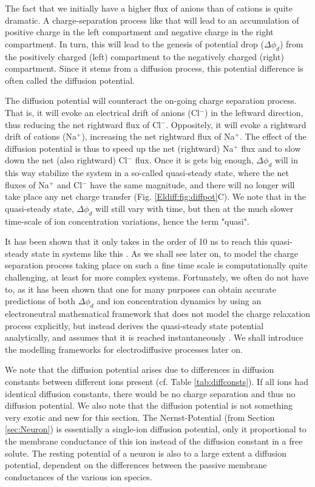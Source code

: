 The fact that we initially have a higher flux of anions than of cations is quite dramatic. A charge-separation process like that will lead to an accumulation of positive charge in the left compartment and negative charge in the right compartment. In turn, this will lead to the genesis of potential drop ($\Delta \phi_d$) from the positively charged (left) compartment to the negatively charged (right) compartment. Since it stems from a diffusion process, this potential difference is often called the diffusion potential. 

The diffusion potential will counteract the on-going charge separation process. That is, it will evoke an electrical drift of anions (Cl$^-$) in the leftward direction, thus reducing the net rightward flux of Cl$^-$. Oppositely, it will evoke a rightward drift of cations (Na$^+$), increasing the net rightward flux of Na$^+$. The effect of the diffusion potential is thus to speed up the net (rightward) Na$^+$ flux and to slow down the net (also rightward) Cl$^-$ flux. Once it is gets big enough, $\Delta \phi_d$ will in this way stabilize the system in a so-called quasi-steady state, where the net fluxes of Na$^+$ and Cl$^-$ have the same magnitude, and there will no longer will take place any net charge transfer (Fig. \ref{Eldiff:fig:diffpot}C). We note that in the quasi-steady state, $\Delta \phi_d$ will still vary with time, but then at the much slower time-scale of ion concentration variations, hence the term "quasi".

It has been shown that it only takes in the order of 10 ns to reach this quasi-steady state in systems like this \cite{Solbra2018}. As we shall see later on, to model the charge separation process taking place on such a fine time scale is computationally quite challenging, at least for more complex systems. Fortunately, we often do not have to, as it has been shown that one for many purposes can obtain accurate predictions of both $\Delta \phi_d$ and ion concentration dynamics by using an electroneutral mathematical framework that does not model the charge relaxation process explicitly, but instead derives the quasi-steady state potential analytically, and assumes that it is reached instantaneously \cite{Solbra2018}. We shall introduce the modelling frameworks for electrodiffusive processes later on.

We note that the diffusion potential arises due to differences in diffusion constants between different ions present  (cf. Table \ref{tab:diffconsts}). If all ions had identical diffusion constants, there would be no charge separation and thus no diffusion potential. We also note that the diffusion potential is not something very exotic and new for this section. The Nernst-Potential (from Section \ref{sec:Neuron}) is essentially a single-ion diffusion potential, only it proportional to the membrane conductance of this ion instead of the diffusion constant in a free solute. The resting potential of a neuron is also to a large extent a diffusion potential, dependent on the differences between the passive membrane conductances of the various ion species.

